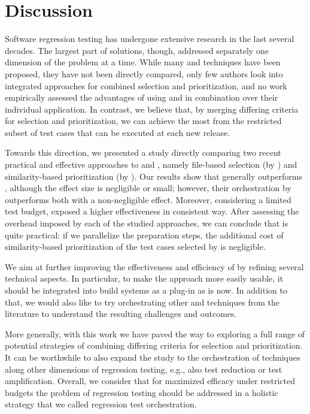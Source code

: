 \section{Discussion}\label{sec:orch_discussion}

Software regression testing has undergone extensive research in the last several decades.
The largest part of solutions, though, addressed separately one dimension of the problem at a time.
While many \tcs and \tcp techniques have been proposed, they have not been directly compared, only
few authors look into integrated approaches for combined selection and prioritization, and no work empirically assessed the advantages of using \tcs and \tcp in combination over their individual application.
In contrast, we believe that, by merging differing criteria for selection and prioritization, we can achieve the most from the restricted subset of test cases that can be executed at each new release.

Towards this direction, we presented a study directly comparing 
two recent practical and effective approaches to \tcs and \tcp, namely 
file-based selection (by \ek) and similarity-based prioritization (by \fs).
Our results show that \ek generally outperforms \fs, although the effect size is negligible or small;
however, their orchestration by \fz outperforms both with a non-negligible effect. 
Moreover, considering a limited test budget, \fz exposed a higher effectiveness in consistent way. 
After assessing the overhead imposed by each of the studied approaches, we can conclude that \fz is quite practical: if we parallelize the preparation steps, the additional cost of similarity-based prioritization of the test cases selected by \ek is negligible.  

We aim at further improving the effectiveness and efficiency of \fz by refining several technical aspects. 
In particular, to make the approach more easily usable, it should be integrated into build systems as a plug-in as \ek is now.
In addition to that, we would also like to try orchestrating other \tcs and \tcp techniques from the literature to understand the resulting challenges and outcomes.

More generally, with this work we have paved the way to exploring a full range of potential strategies of combining differing criteria for selection and prioritization. 
It can be worthwhile to also expand the study to the orchestration of techniques along other dimensions of regression testing, e.g., also test reduction or test amplification.
Overall, we consider that  for maximized efficacy under restricted budgets the problem of regression testing should be addressed in a holistic strategy that we called regression test orchestration. 
